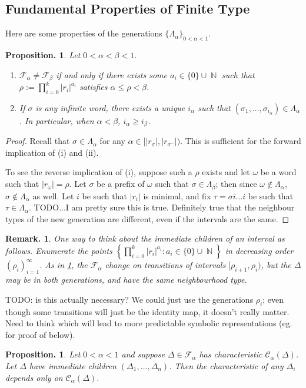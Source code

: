 \documentclass[11pt, a4paper]{memoir}
\DeclareMathOperator{\N}{{\mathbb{N}}}
\theoremstyle{change}
\newtheorem{proposition}[theorem]{Proposition.}
\theoremstyle{plain}
\theoremstyle{nonumberplain}
\newtheorem{remark}{Remark.}
\newtheorem{proof}{Proof}
\numberwithin{equation}{section}
\begin{document}
\subsection{Fundamental Properties of Finite Type}
Here are some properties of the generations $\{\Lambda_\alpha\}_{0<\alpha<1}$.
\begin{proposition}\label{p:gfin}
    Let $0<\alpha<\beta<1$.
    \begin{enumerate}[nl,r]
        \item $\mathcal{F}_\alpha\neq\mathcal{F}_\beta$ if and only if there exists some $a_i\in\{0\}\cup\N$ such that $\rho:=\prod_{i=0}^k |r_i|^{a_i}$ satisfies $\alpha\leq\rho<\beta$.
        \item If $\sigma$ is any infinite word, there exists a unique $i_\alpha$ such that $(\sigma_1,\ldots,\sigma_{i_\alpha})\in\Lambda_\alpha$.
            In particular, when $\alpha<\beta$, $i_\alpha\geq i_\beta$.
    \end{enumerate}
\end{proposition}
\begin{proof}
    Recall that $\sigma\in\Lambda_\alpha$ for any $\alpha\in[|r_\sigma|,|r_{\sigma^-}|)$.
    This is sufficient for the forward implication of (i) and (ii).

    To see the reverse implication of (i), suppose such a $\rho$ exists and let $\omega$ be a word such that $|r_\omega|=\rho$.
    Let $\sigma$ be a prefix of $\omega$ such that $\sigma\in\Lambda_\beta$; then since $\omega\notin\Lambda_\alpha$, $\sigma\notin\Lambda_\alpha$ as well.
    Let $i$ be such that $|r_i|$ is minimal, and fix $\tau=\sigma i\ldots i$ be such that $\tau\in\Lambda_\alpha$.
    TODO...I am pretty sure this is true.
    Definitely true that the neighbour types of the new generation are different, even if the intervals are the same.
\end{proof}
\begin{remark}
    One way to think about the immediate children of an interval as follows.
    Enumerate the points $\left\{\prod_{i=0}^k|r_i|^{a_i}:a_i\in\{0\}\cup\N\right\}$ in decreasing order $(\rho_i)_{i=1}^\infty$.
    As in \cref{p:gfin}, the $\mathcal{F}_\alpha$ change on transitions of intervals $[\rho_{i+1},\rho_{i})$, but the $\Delta$ may be in both generations, and have the same neighbourhood type.
\end{remark}
TODO: is this actually necessary?
We could just use the generations $\rho_i$; even though some transitions will just be the identity map, it doesn't really matter.
Need to think which will lead to more predictable symbolic representations (eg. for proof of below).
\begin{proposition}
    Let $0<\alpha<1$ and suppose $\Delta\in\mathcal{F}_\alpha$ has characteristic $\mathcal{C}_\alpha(\Delta)$.
    Let $\Delta$ have immediate children $(\Delta_1,\ldots,\Delta_n)$.
    Then the characteristic of any $\Delta_i$ depends only on $\mathcal{C}_\alpha(\Delta)$.
\end{proposition}
\end{document}
